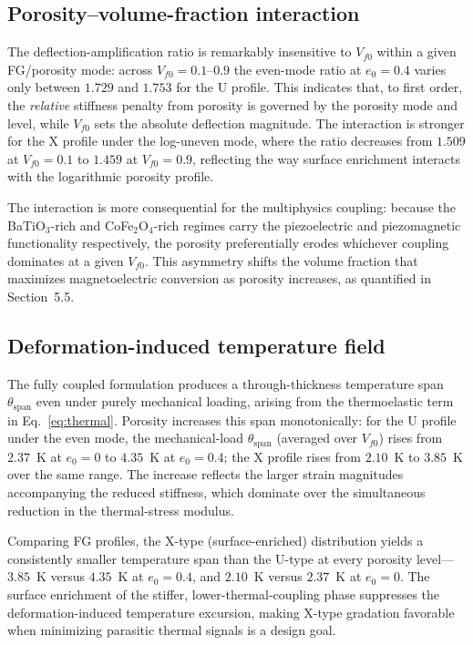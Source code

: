 \documentclass[11pt,a4paper]{article}
\begin{document}
\subsection{Porosity--volume-fraction interaction}

The deflection-amplification ratio is remarkably insensitive to $V_{f0}$ within a given FG/porosity mode: across $V_{f0}=0.1$--$0.9$ the even-mode ratio at $e_0=0.4$ varies only between $1.729$ and $1.753$ for the U profile. This indicates that, to first order, the \emph{relative} stiffness penalty from porosity is governed by the porosity mode and level, while $V_{f0}$ sets the absolute deflection magnitude. The interaction is stronger for the X profile under the log-uneven mode, where the ratio decreases from $1.509$ at $V_{f0}=0.1$ to $1.459$ at $V_{f0}=0.9$, reflecting the way surface enrichment interacts with the logarithmic porosity profile.

The interaction is more consequential for the multiphysics coupling: because the BaTiO$_3$-rich and CoFe$_2$O$_4$-rich regimes carry the piezoelectric and piezomagnetic functionality respectively, the porosity preferentially erodes whichever coupling dominates at a given $V_{f0}$. This asymmetry shifts the volume fraction that maximizes magnetoelectric conversion as porosity increases, as quantified in Section~5.5.

\subsection{Deformation-induced temperature field}

The fully coupled formulation produces a through-thickness temperature span $\theta_{\text{span}}$ even under purely mechanical loading, arising from the thermoelastic term in Eq.~\eqref{eq:thermal}. Porosity increases this span monotonically: for the U profile under the even mode, the mechanical-load $\theta_{\text{span}}$ (averaged over $V_{f0}$) rises from $2.37$~K at $e_0=0$ to $4.35$~K at $e_0=0.4$; the X profile rises from $2.10$~K to $3.85$~K over the same range. The increase reflects the larger strain magnitudes accompanying the reduced stiffness, which dominate over the simultaneous reduction in the thermal-stress modulus.

Comparing FG profiles, the X-type (surface-enriched) distribution yields a consistently smaller temperature span than the U-type at every porosity level---$3.85$~K versus $4.35$~K at $e_0=0.4$, and $2.10$~K versus $2.37$~K at $e_0=0$. The surface enrichment of the stiffer, lower-thermal-coupling phase suppresses the deformation-induced temperature excursion, making X-type gradation favorable when minimizing parasitic thermal signals is a design goal.
\end{document}
